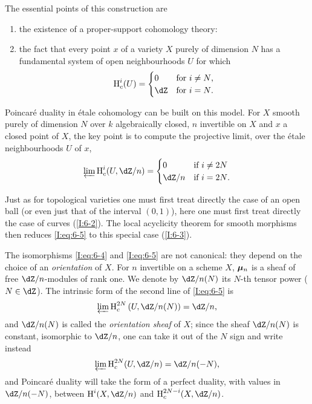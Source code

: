 The essential points of this construction are
\begin{enumerate}[\indent a)]
  \item the existence of a proper-support cohomology theory:
  \item the fact that every point $x$ of a variety $X$ purely of dimension
    $N$ has a fundamental system of open neighbourhoods $U$ for which
    \begin{equation}\label{I:eq:6-4}
      \h_c^i(U) = \begin{cases}
                    0   & \text{for $i\ne N$,} \\
                    \dZ & \text{for $i=N$.}
                  \end{cases}
    \end{equation}
\end{enumerate}

Poincar\'e duality in \'etale cohomology can be built on this
model. For $X$ smooth purely of dimension $N$ over $k$ algebraically closed,
$n$ invertible on $X$ and $x$ a closed point of $X$, the key point is to
compute the projective limit, over the \'etale neighbourhoods $U$ of $x$,
\begin{equation}\label{I:eq:6-5}
  \varprojlim \h_c^i(U,\dZ/n)
    = \begin{cases}
        0     & \text{if $i\ne 2N$} \\
        \dZ/n & \text{if $i=2N$.}
      \end{cases}
\end{equation}

Just as for topological varieties one must first treat
directly the case of an open ball (or even just that of the interval
$(0,1)$), here one must first treat directly the case of curves
(\ref{I:6-2}). The local acyclicity theorem for smooth morphisms
then reduces \eqref{I:eq:6-5} to this special case (\ref{I:6-3}).

The isomorphisms \eqref{I:eq:6-4} and \eqref{I:eq:6-5} are not canonical:
they depend on the choice of an \emph{orientation} of $X$. For $n$ invertible
on a scheme $X$, ${\bm\mu}_n$ is a sheaf of free $\dZ/n$-modules of rank
one. We denote by $\dZ/n(N)$ its $N$-th tensor power ($N\in\dZ$). The
intrinsic form of the second line of \eqref{I:eq:6-5} is
\begin{equation}\label{I:eq:6-5'}
  \varprojlim \h_c^{2N} \left(U,\dZ/n(N)\right) = \dZ/n \text{,}
\end{equation}
and $\dZ/n(N)$ is called the \emph{orientation sheaf} of $X$; since the sheaf
$\dZ/n(N)$ is constant, isomorphic to $\dZ/n$, one can take it out
of the $N$ sign and write instead
\begin{equation}\label{I:eq:6-5''}
  \varprojlim \h_c^{2N} (U,\dZ/n) = \dZ/n(-N) \text{,}
\end{equation}
and Poincar\'e duality will take the form of a perfect duality, with
values in $\dZ/n(-N)$, between $\h^i(X,\dZ/n)$ and $\h_c^{2N-i}(X,\dZ/n)$. 











